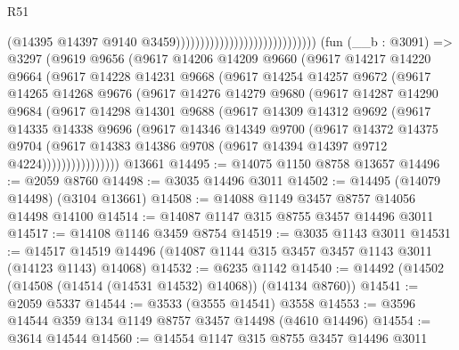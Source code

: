 \begin{lexlean}{R51}
\begin{coremodule}
                                                            (@14395
                                                              @14397
                                                              @9140
                                                              @3459)))))))))))))))))))))))))))))
    (fun (__b : @3091) =>
    @3297
      (@9619
        @9656
        (@9617
          @14206
          @14209
          @9660
          (@9617
            @14217
            @14220
            @9664
            (@9617
              @14228
              @14231
              @9668
              (@9617
                @14254
                @14257
                @9672
                (@9617
                  @14265
                  @14268
                  @9676
                  (@9617
                    @14276
                    @14279
                    @9680
                    (@9617
                      @14287
                      @14290
                      @9684
                      (@9617
                        @14298
                        @14301
                        @9688
                        (@9617
                          @14309
                          @14312
                          @9692
                          (@9617
                            @14335
                            @14338
                            @9696
                            (@9617
                              @14346
                              @14349
                              @9700
                              (@9617
                                @14372
                                @14375
                                @9704
                                (@9617
                                  @14383
                                  @14386
                                  @9708
                                  (@9617 @14394 @14397 @9712 @4224))))))))))))))))
    @13661
@14495 := @14075 @1150 @8758 @13657
@14496 := @2059 @8760
@14498 := @3035 @14496 @3011
@14502 := @14495 (@14079 @14498) (@3104 @13661)
@14508 := @14088 @1149 @3457 @8757 @14056 @14498 @14100
@14514 := @14087 @1147 @315 @8755 @3457 @14496 @3011
@14517 := @14108 @1146 @3459 @8754
@14519 := @3035 @1143 @3011
@14531 := @14517 @14519 @14496 (@14087 @1144 @315 @3457 @3457 @1143 @3011 (@14123 @1143) @14068)
@14532 := @6235 @1142
@14540 := @14492 (@14502 (@14508 (@14514 (@14531 @14532) @14068)) (@14134 @8760))
@14541 := @2059 @5337
@14544 := @3533 (@3555 @14541) @3558
@14553 := @3596 @14544 @359 @134 @1149 @8757 @3457 @14498 (@4610 @14496)
@14554 := @3614 @14544
@14560 := @14554 @1147 @315 @8755 @3457 @14496 @3011

\end{coremodule}
\end{lexlean}
